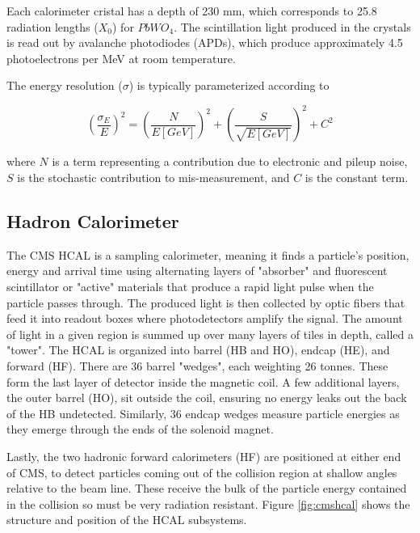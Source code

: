 Each calorimeter cristal has a depth of 230 mm, which corresponds to 25.8 radiation lengths ($X_{0}$) for $PbWO_{4}$. The scintillation light produced in the crystals is read out by avalanche photodiodes (APDs), which produce approximately 4.5 photoelectrons per MeV at room temperature.

The energy resolution ($\sigma$) is typically parameterized according to

\begin{equation}
(\frac{\sigma_{E}}{E})^{2} = (\frac{N}{E[GeV]})^{2} + (\frac{S}{\sqrt{E[GeV]}})^{2} + C^{2}
\end{equation}

where $N$ is a term representing a contribution due to electronic and pileup noise, $S$ is the stochastic contribution to mis-measurement, and $C$ is the constant term. 


 \subsection{Hadron Calorimeter}

 The CMS HCAL is a sampling calorimeter, meaning it finds a particle's position, energy and arrival time using alternating layers of "absorber" and fluorescent scintillator or "active" materials that produce a rapid light pulse when the particle passes through. The produced light is then collected by optic fibers that feed it into readout boxes where photodetectors amplify the signal. The amount of light in a given region is summed up over many layers of tiles in depth, called a "tower". The HCAL is organized into barrel (HB and HO), endcap (HE), and forward (HF). There are 36 barrel "wedges", each weighting 26 tonnes. These form the last layer of detector inside the magnetic coil. A few additional layers, the outer barrel (HO), sit outside the coil, ensuring no energy leaks out the back of the HB undetected. Similarly, 36 endcap wedges measure particle energies as they emerge through the ends of the solenoid magnet.

 Lastly, the two hadronic forward calorimeters (HF) are positioned at either end of CMS, to detect particles coming out of the collision region at shallow angles relative to the beam line. These receive the bulk of the particle energy contained in the collision so must be very radiation resistant. Figure \ref{fig:cmshcal} shows the structure and position of the HCAL subsystems. 

